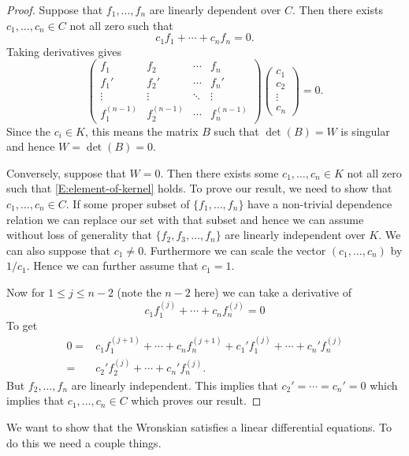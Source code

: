 \documentclass[12pt]{book}
\numberwithin{equation}{section}
\theoremstyle{definition}
\theoremstyle{remark}
\begin{document}
\begin{proof}
	Suppose that $f_1,\ldots,f_n$ are linearly dependent over $C$.
	Then there exists $c_1,\ldots,c_n \in C$ not all zero such that 
	 $$ c_1 f_1 + \cdots + c_n f_n =0.$$
	 Taking derivatives gives 
	  \begin{equation} \label{E:element-of-kernel}
	  	\begin{pmatrix}
	  f_1 & f_2 & \cdots & f_n \\
	  f_1' & f_2' & \cdots & f_n' \\
	  \vdots & \vdots & \ddots & \vdots \\
	  f_1^{(n-1)} & f_2^{(n-1)} & \cdots & f_n^{(n-1)}
	  \end{pmatrix} \begin{pmatrix} c_1 \\ c_2 \\  \vdots  \\ c_n \end{pmatrix} =0.
  \end{equation}
	 Since the $c_i \in K$, this means the matrix $B$ such that $\det(B)=W$ is singular and hence $W=\det(B)=0$.
	 
	 Conversely, suppose that $W=0$. 
	 Then there exists some $c_1,\ldots,c_n \in K$ not all zero such that \eqref{E:element-of-kernel} holds. 
	 To prove our result, we need to show that $c_1,\ldots, c_n \in C$. 
	 If some proper subset of $\lbrace f_1,\ldots, f_n \rbrace$ have a non-trivial dependence relation we can replace our set with that subset and hence we can assume without loss of generality that $\lbrace f_2,f_3,\ldots, f_n \rbrace$ are linearly independent over $K$. 
	 We can also suppose that $c_1\neq 0$. 
	 Furthermore we can scale the vector $(c_1,\ldots,c_n)$ by $1/c_1$.
	 Hence we can further assume that $c_1=1$.  
	 
	 Now for $1\leq j \leq n-2$ (note the $n-2$ here) we can take a derivative of 
	  $$ c_1 f_1^{(j)} + \cdots + c_n f_n^{(j)} =0 $$
	 To get 
	 \begin{align*}
	 		   0 =& c_1 f_1^{(j+1)} + \cdots + c_n f_n^{(j+1)} + c_1'  f _1^{(j)} + \cdots + c_n' f_n^{(j)} \\
	 		   =&  c_2'  f _2^{(j)} + \cdots + c_n' f_n^{(j)}.
	\end{align*}
	But $f_2,\ldots,f_n$ are linearly independent. 
	This implies that $c_2'=\cdots=c_n'=0$ which implies that $c_1,\ldots,c_n \in C$ which proves our result. 
\end{proof}

We want to show that the Wronskian satisfies a linear differential equations. 
To do this we need a couple things. 
\end{document}
